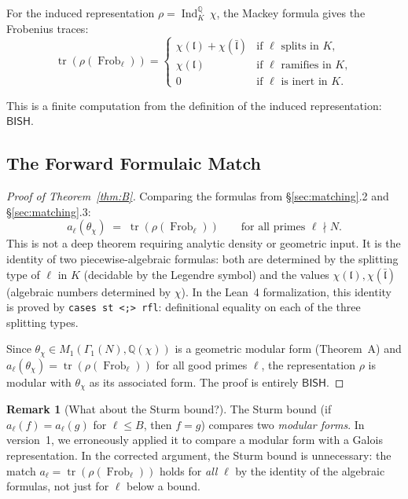 \documentclass[11pt,a4paper]{article}
\theoremstyle{plain}
\theoremstyle{definition}
\newtheorem{remark}[theorem]{Remark}
\newcommand{\BISH}{\textsf{BISH}}
\newcommand{\Q}{\mathbb{Q}}
\DeclareMathOperator{\tr}{tr}
\DeclareMathOperator{\Ind}{Ind}
\DeclareMathOperator{\Frob}{Frob}
\begin{document}
For the induced representation $\rho = \Ind_K^\Q\, \chi$, the Mackey formula gives the Frobenius traces:
\[
\tr(\rho(\Frob_\ell)) = \begin{cases}
\chi(\mathfrak{l}) + \chi(\bar{\mathfrak{l}}) & \text{if } \ell \text{ splits in } K, \\
\chi(\mathfrak{l}) & \text{if } \ell \text{ ramifies in } K, \\
0 & \text{if } \ell \text{ is inert in } K.
\end{cases}
\]

This is a finite computation from the definition of the induced representation: $\BISH$.

\subsection{The Forward Formulaic Match}

\begin{proof}[Proof of Theorem~\ref{thm:B}]
Comparing the formulas from \S\ref{sec:matching}.2 and \S\ref{sec:matching}.3:
\[
a_\ell(\theta_\chi) \;=\; \tr(\rho(\Frob_\ell)) \qquad \text{for all primes } \ell \nmid N.
\]
This is not a deep theorem requiring analytic density or geometric input.
It is the identity of two piecewise-algebraic formulas: both are determined by the splitting type of $\ell$ in $K$ (decidable by the Legendre symbol) and the values $\chi(\mathfrak{l}), \chi(\bar{\mathfrak{l}})$ (algebraic numbers determined by $\chi$).
In the Lean~4 formalization, this identity is proved by \texttt{cases st <;> rfl}: definitional equality on each of the three splitting types.

Since $\theta_\chi \in M_1(\Gamma_1(N), \Q(\chi))$ is a geometric modular form (Theorem~A) and $a_\ell(\theta_\chi) = \tr(\rho(\Frob_\ell))$ for all good primes $\ell$, the representation $\rho$ is modular with $\theta_\chi$ as its associated form.
The proof is entirely $\BISH$.
\end{proof}

\begin{remark}[What about the Sturm bound?]\label{rem:sturm}
The Sturm bound (if $a_\ell(f) = a_\ell(g)$ for $\ell \leq B$, then $f = g$) compares two \emph{modular forms}.
In version~1, we erroneously applied it to compare a modular form with a Galois representation.
In the corrected argument, the Sturm bound is unnecessary: the match $a_\ell = \tr(\rho(\Frob_\ell))$ holds for \emph{all} $\ell$ by the identity of the algebraic formulas, not just for $\ell$ below a bound.
\end{remark}
\end{document}
